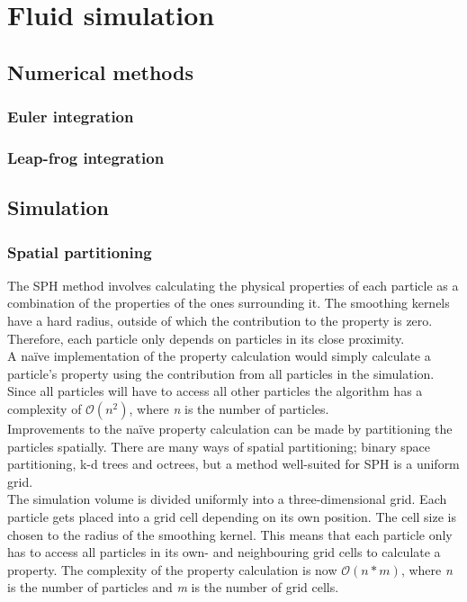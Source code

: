 \documentclass[paper=a4, fontsize=11pt]{report}
\numberwithin{equation}{section} %
\numberwithin{figure}{section} %
\numberwithin{table}{section} %
\begin{document}
\chapter{Fluid simulation}
\section{Numerical methods}
\subsection{Euler integration}
\subsection{Leap-frog integration}

\section{Simulation}

\subsection{Spatial partitioning}

The SPH method involves calculating the physical properties of each particle as a combination of the properties of the ones surrounding it. The smoothing kernels have a hard radius, outside of which the contribution to the property is zero. Therefore, each particle only depends on particles in its close proximity. \\

A naïve implementation of the property calculation would simply calculate a particle's property using the contribution from all particles in the simulation. Since all particles will have to access all other particles the algorithm has a complexity of $\mathcal{O}{(n^2)}$, where \emph{n} is the number of particles. \\

Improvements to the naïve property calculation can be made by partitioning the particles spatially. There are many ways of spatial partitioning; binary space partitioning, k-d trees and octrees, but a method well-suited for SPH is a uniform grid. \\

The simulation volume is divided uniformly into a three-dimensional grid. Each particle gets placed into a grid cell depending on its own position. The cell size is chosen to the radius of the smoothing kernel. This means that each particle only has to access all particles in its own- and neighbouring grid cells to calculate a property. The complexity of the property calculation is now $\mathcal{O}{(n*m)}$, where \emph{n} is the number of particles and \emph{m} is the number of grid cells.
\end{document}
